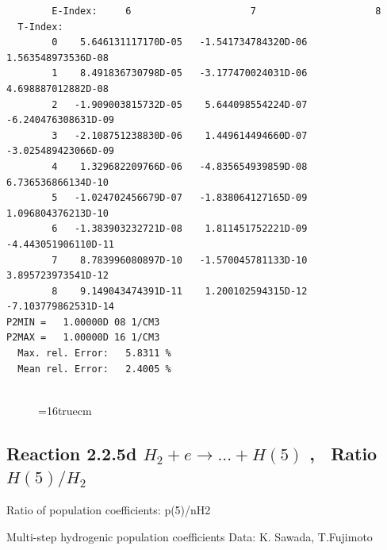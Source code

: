 \documentclass[12pt,dvipdfmx]{article}
\begin{document}
\begin{small}
\begin{verbatim}
        E-Index:     6                     7                     8
  T-Index:
        0    5.646131117170D-05   -1.541734784320D-06    1.563548973536D-08
        1    8.491836730798D-05   -3.177470024031D-06    4.698887012882D-08
        2   -1.909003815732D-05    5.644098554224D-07   -6.240476308631D-09
        3   -2.108751238830D-06    1.449614494660D-07   -3.025489423066D-09
        4    1.329682209766D-06   -4.835654939859D-08    6.736536866134D-10
        5   -1.024702456679D-07   -1.838064127165D-09    1.096804376213D-10
        6   -1.383903232721D-08    1.811451752221D-09   -4.443051906110D-11
        7    8.783996080897D-10   -1.570045781133D-10    3.895723973541D-12
        8    9.149043474391D-11    1.200102594315D-12   -7.103779862531D-14
P2MIN =   1.00000D 08 1/CM3
P2MAX =   1.00000D 16 1/CM3
  Max. rel. Error:   5.8311 %
  Mean rel. Error:   2.4005 %


\end{verbatim}\end{small}
\begin{figure} \label{2.2.5c}
\epsfxsize=16truecm
\end{figure}
\newpage
\subsection{
Reaction 2.2.5d  $H_2 + e \rightarrow ...+ H(5)  $ , \  Ratio $H(5)/H_2 $
}

 Ratio of population coefficients: p(5)/nH2

 Multi-step hydrogenic population coefficients
 Data: K. Sawada, T.Fujimoto \cite{kn:Sawada}
\end{document}
